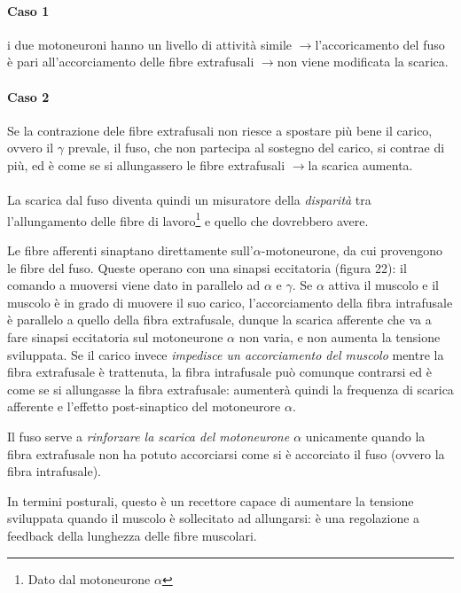 \documentclass[a4paper,12pt]{article}
\newcommand{\lfreccia}{\ensuremath{\longrightarrow}}
\begin{document}
\paragraph{Caso 1} i due motoneuroni hanno un livello di attività simile \lfreccia l'accoricamento del fuso è pari all'accorciamento delle fibre extrafusali \lfreccia non viene modificata la scarica.

\paragraph{Caso 2} Se la contrazione dele fibre extrafusali non riesce a spostare più bene il carico, ovvero il $\gamma$ prevale, il fuso, che non partecipa al sostegno del carico, si contrae di più, ed è come se si allungassero le fibre extrafusali \lfreccia la scarica aumenta.

\paragraph{}
La scarica dal fuso diventa quindi un misuratore della \emph{disparità} tra l'allungamento delle fibre di lavoro\footnote{Dato dal motoneurone $\alpha$} e quello che dovrebbero avere.

Le fibre afferenti sinaptano direttamente sull'$\alpha$-motoneurone, da cui provengono le fibre del fuso. Queste operano con una sinapsi eccitatoria (figura 22): il comando a muoversi viene dato in parallelo ad $\alpha$ e $\gamma$. Se $\alpha$ attiva il muscolo e il muscolo è in grado di muovere il suo carico, l'accorciamento della fibra intrafusale è parallelo a quello della fibra extrafusale, dunque la scarica afferente che va a fare sinapsi eccitatoria sul motoneurone $\alpha$ non varia, e non aumenta la tensione sviluppata. Se il carico invece \emph{impedisce un accorciamento del muscolo} mentre la fibra extrafusale è trattenuta, la fibra intrafusale può comunque contrarsi ed è come se si allungasse la fibra extrafusale: aumenterà quindi la frequenza di scarica afferente e l'effetto post-sinaptico del motoneurore $\alpha$. 

Il fuso serve a \emph{rinforzare la scarica del motoneurone $\alpha$} unicamente quando la fibra extrafusale non ha potuto accorciarsi come si è accorciato il fuso (ovvero la fibra intrafusale).

In termini posturali, questo è un recettore capace di aumentare la tensione sviluppata quando il muscolo è sollecitato ad allungarsi: è una regolazione a feedback della lunghezza delle fibre muscolari.
\end{document}
